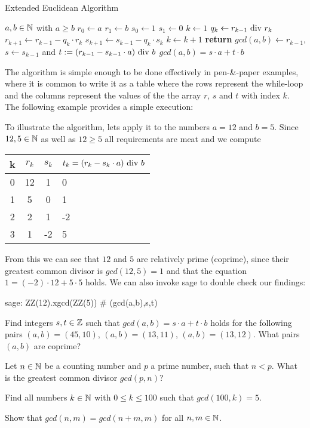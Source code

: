 \begin{algorithm}\caption{Extended Euclidean Algorithm}
\label{alg_ext_euclid_alg}
\begin{algorithmic}[0]
\Require $a,b \in \mathbb{N}$ with $a\geq b$
\State $r_0\gets a$
\State $r_1\gets b$
\State $s_0\gets 1$
\State $s_1\gets 0$
\State $k\gets 1$
\State $ q_k\gets r_{k-1} \text{ div } r_k $
\State $ r_{k + 1}\gets r_{k-1} -q_k \cdot r_k $
\State $ s_{k + 1}\gets s_{k-1} -q_k \cdot s_k $
\State $ k \gets k + 1 $
\EndWhile
\State \textbf{return} $gcd(a,b)\gets r_{k-1}$, $s\gets s_{k-1}$ and $ t: = (r_{k-1}-s_{k-1} \cdot a) \text{ div } b $ 
\EndProcedure
\Ensure $ gcd (a, b) = s \cdot a + t \cdot b $
\end{algorithmic}
\end{algorithm}
The algorithm is simple enough to be done effectively in pen-\&-paper examples, where it is common to write it as a table where the rows represent the while-loop and the columns represent the values of the the array $r$, $s$ and $t$ with index $k$. The following example provides a simple execution:
\begin{example} To illustrate the algorithm, lets apply it to the numbers $a=12$ and $b=5$. Since $12,5\in \mathbb{N}$ as well as $12\geq 5$ all requirements are meat and we compute
\begin{center}
  \begin{tabular}{c | c c l}
    k & $ r_k $ & $ s_k $ & $ t_k = (r_k-s_k \cdot a) \text{ div } b $ \\\hline
    0 & 12 & 1 & 0 \\
    1 & 5 & 0 & 1 \\
    2 & 2 & 1 & -2 \\
    3 & 1 & -2 & 5 \\
  \end{tabular}
\end{center}
From this we can see that $ 12 $ and $ 5 $ are relatively prime (coprime), since their greatest common divisor is $ gcd (12, 5) = 1 $ and that the equation $ 1 = (-2) \cdot 12 + 5 \cdot 5 $ holds. We can also invoke sage to double check our findings:
\begin{sagecommandline}
sage: ZZ(12).xgcd(ZZ(5)) # (gcd(a,b),s,t)
\end{sagecommandline}
\end{example}
\begin{exercise}
Find integers $s,t\in\mathbb{Z}$ such that $gcd(a,b)= s\cdot a +t\cdot b$ holds for the following pairs $(a,b) = (45,10)$, $(a,b)=(13,11)$, $(a,b)=(13,12)$. What pairs $(a,b)$ are coprime?
\end{exercise}
\begin{exercise}
Let $n\in \mathbb{N}$ be a counting number and $p$ a prime number, such that $n<p$. What is the greatest common divisor $gcd(p,n)$?
\end{exercise}
\begin{exercise}
Find all numbers $k\in\mathbb{N}$ with $0\leq k \leq 100$ such that $gcd(100,k) = 5$.
\end{exercise}
\begin{exercise}
Show that $gcd(n,m) = gcd(n+m,m)$ for all $n,m\in\mathbb{N}$.
\end{exercise}
